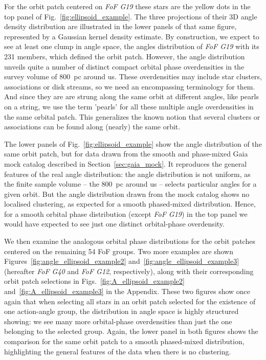 \documentclass[twocolumn]{aastex631}
\begin{document}
For the orbit patch centered on \textit{FoF G19} these stars are the yellow dots in the top panel of Fig.~\ref{fig:ellipsoid_example}. The three projections of their 3D angle density distribution are illustrated in the lower panels of that same figure, represented by a Gaussian kernel density estimate. By construction, we expect to see at least one clump in angle space, the angles distribution of \textit{FoF G19} with its 231 members, which defined the orbit patch. However, the angle distribution unveils quite a number of distinct compact orbital phase overdensities in the survey volume of 800~pc around us.
These overdensities may include star clusters, associations or disk streams, so we need an encompassing terminology for them. And since they are are strung along the same orbit at different angles, like pearls on a string, we use the term 'pearls' for all these multiple angle overdensities in the same orbital patch. This generalizes the known notion that several clusters or associations can be found along (nearly) the same orbit.  

The lower panels of Fig.~\ref{fig:ellipsoid_example} show the angle distribution of the same orbit patch, but for data drawn from the smooth and phase-mixed Gaia mock catalog described in Section~\ref{sec:gaia_mock}. It reproduces the general features of the real angle distribution: the angle distribution is not uniform, as the finite sample volume -- the 800~pc around us -- selects particular angles for a given orbit. But the angle distribution drawn from the mock catalog shows no localised clustering, as expected for a smooth phased-mixed distribution. Hence, for a smooth orbital phase distribution (except \textit{FoF G19}) in the top panel we would have expected to see just one distinct orbital-phase overdensity. 

We then examine the analogous orbital phase distributions for the orbit patches centered on the remaining 54 FoF groups. Two more examples are shown Figures~\ref{fig:angle_ellipsoid_example2} and~\ref{fig:angle_ellipsoid_example3} (hereafter \textit{FoF G40} and \textit{FoF G12}, respectively), along with their corresponding orbit patch selections in Figs.~\ref{fig:A_ellipsoid_example2} and~\ref{fig:A_ellipsoid_example3} in the Appendix. These two figures show once again that when selecting all stars in an orbit patch selected for the existence of one action-angle group, the distribution in angle space is highly structured showing: we see many more orbital-phase overdensities than just the one belonging to the selected group. Again, the lower panel in both figures shows the comparison for the same orbit patch to a smooth phased-mixed distribution, highlighting the general features of the data when there is no clustering.
\end{document}
